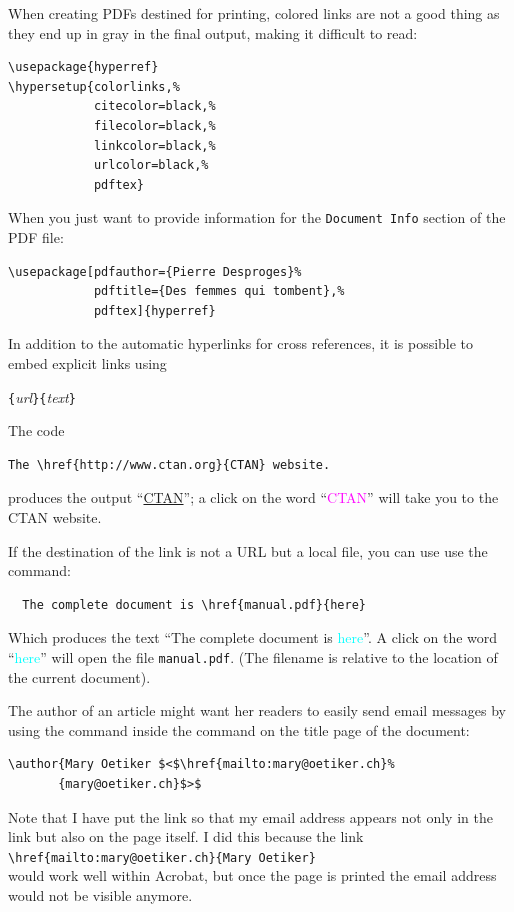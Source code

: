 When creating PDFs destined for printing, colored links are not a
  good thing as they end up in gray in the final output, making it
  difficult to read:
\begin{code}
\begin{verbatim}
\usepackage{hyperref}
\hypersetup{colorlinks,%
            citecolor=black,%
            filecolor=black,%
            linkcolor=black,%
            urlcolor=black,%
            pdftex}
\end{verbatim}
\end{code}

When you just want to provide information for the
  \texttt{Document Info} section of the PDF file:
\begin{code}
\begin{verbatim}
\usepackage[pdfauthor={Pierre Desproges}%
            pdftitle={Des femmes qui tombent},%
            pdftex]{hyperref}
\end{verbatim}
\end{code}

\vspace{\baselineskip}

In addition to the automatic hyperlinks for cross references, it is
possible to embed explicit links using
\begin{lscommand}
\verb|{|\emph{url}\verb|}{|\emph{text}\verb|}|
\end{lscommand}

The code
\begin{code}
\begin{verbatim}
The \href{http://www.ctan.org}{CTAN} website.
\end{verbatim}
\end{code}
produces the output ``\href{http://www.ctan.org}{CTAN}'';
a click on the word ``\textcolor{magenta}{CTAN}''
will take you to the CTAN website.

If the destination of the link is not a URL but a local file,
  you can use use the  command: 
\begin{verbatim}
  The complete document is \href{manual.pdf}{here}
\end{verbatim}
Which produces the text ``The complete document is \textcolor{cyan}{here}''.
A click on the word
``\textcolor{cyan}{here}''
will open the file \texttt{manual.pdf}. (The filename is relative to
the location of the current document).

The author of an article might want her readers to easily send
  email messages by using the  command inside the 
  command on the title page of the document:
\begin{code}
\begin{verbatim}
\author{Mary Oetiker $<$\href{mailto:mary@oetiker.ch}%
       {mary@oetiker.ch}$>$
\end{verbatim}
\end{code}
Note that I have put the link so that my email address appears not only
in the link but also on the page itself. I did this because the
link\\
\verb+\href{mailto:mary@oetiker.ch}{Mary Oetiker}+\\
would
work well within Acrobat, but once the page is printed the email address
would not be visible anymore.


